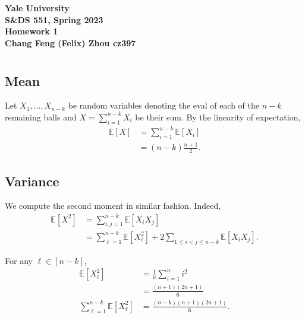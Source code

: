 \documentclass[10pt]{article}
\newcommand{\E}{\mathbb{E}}
\begin{document}
\begin{center}
    {\Large\textbf{Yale University}}\\
    \vspace{3mm}
    {\Large\textbf{S\&DS 551, Spring 2023}}\\
    \vspace{2mm}
    {\Large\textbf{Homework 1}}\\
    \vspace{3mm}
    \textbf{Chang Feng (Felix) Zhou cz397}
\end{center}

\section{}
\subsection{Mean}
Let $X_1, \dots, X_{n-k}$ be random variables denoting the eval of each of the $n-k$ remaining balls
and $X = \sum_{i=1}^{n-k} X_i$ be their sum.
By the linearity of expectation,
\begin{align*}
  \E[X]
  &= \sum_{i=1}^{n-k} \E[X_i] \\
  &= \boxed{(n-k) \frac{n+1}2}.
\end{align*}

\subsection{Variance}
We compute the second moment in similar fashion.
Indeed,
\begin{align*}
  \E[X^2]
  &= \sum_{i, j=1}^{n-k} \E[X_iX_j] \\
  &= \sum_{\ell=1}^{n-k} \E[X_\ell^2] + 2 \sum_{1\leq i<j\leq n-k} \E[X_iX_j].
\end{align*}

For any $\ell\in [n-k]$,
\begin{align*}
  \E[X_\ell^2]
  &= \frac1n \sum_{i=1}^n i^2 \\
  &= \frac{(n+1)(2n+1)}6 \\
  \sum_{\ell=1}^{n-k} \E[X_\ell^2]
  &= \frac{(n-k)(n+1)(2n+1)}6.
\end{align*}
\end{document}
